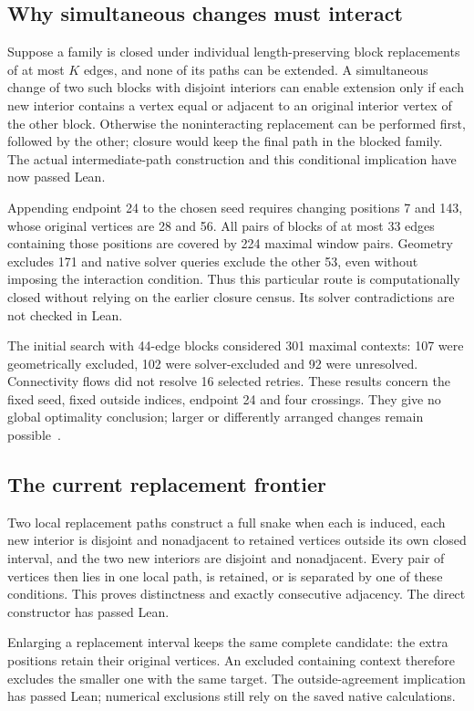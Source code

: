 \documentclass[11pt,a4paper]{article}
\begin{document}
\subsection{Why simultaneous changes must interact}
Suppose a family is closed under individual length-preserving block
replacements of at most $K$ edges, and none of its paths can be extended.
A simultaneous change of two such blocks with disjoint interiors can
enable extension only if each new interior contains a vertex equal or
adjacent to an original interior vertex of the other block. Otherwise the noninteracting replacement can be
performed first, followed by the other; closure would keep the final
path in the blocked family. The actual intermediate-path construction
and this conditional implication have now passed Lean.

Appending endpoint 24 to the chosen seed requires changing positions
7 and 143, whose original vertices are 28 and 56. All pairs of blocks
of at most 33 edges containing those positions are covered by 224
maximal window pairs. Geometry excludes 171 and native solver queries
exclude the other 53, even without imposing the interaction condition.
Thus this particular route is computationally closed without relying
on the earlier closure census. Its solver contradictions are not checked
in Lean.

The initial search with 44-edge blocks considered 301 maximal contexts:
107 were geometrically excluded, 102 were solver-excluded and 92 were unresolved. Connectivity
flows did not resolve 16 selected retries. These results concern the
fixed seed, fixed outside indices, endpoint 24 and four crossings.
They give no global optimality conclusion; larger or differently
arranged changes remain possible~\cite{research224}.

\subsection{The current replacement frontier}
Two local replacement paths construct a full snake when each is induced,
each new interior is disjoint and nonadjacent to retained vertices
outside its own closed interval, and the
two new interiors are disjoint and nonadjacent. Every pair of vertices
then lies in one local path, is retained, or is separated by one of these
conditions. This proves distinctness and exactly consecutive adjacency.
The direct constructor has passed Lean.

Enlarging a replacement interval keeps the same complete candidate:
the extra positions retain their original vertices. An excluded
containing context therefore excludes the smaller one with the same
target. The outside-agreement implication has passed Lean; numerical
exclusions still rely on the saved native calculations.
\end{document}
